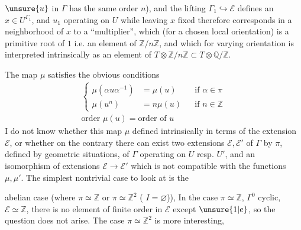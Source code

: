 

\(\unsure{u}\) in \(\Gamma\) has the same order \(n\)),
and the lifting \(\Gamma_1\hookrightarrow\mathcal E\) defines an
\(x\in U^{\Gamma_1}\),  and \(u_1\) operating on \(U\)
while leaving \(x\) fixed therefore corresponds in a neighborhood of \(x\) to a
``multiplier'', which (for a chosen local orientation) is a
primitive  root of \(1\) i.e. an element of
\(\mathbb Z/n\mathbb Z\), and which for varying orientation
is interpreted intrinsically as an element of
\(T\otimes\mathbb Z/n\mathbb Z
\subset T\otimes\mathbb Q/\mathbb Z\).

The map \(\mu\) satisfies the obvious conditions
\[
\begin{gathered}
\left\{
\begin{aligned}
\mu(\alpha u\alpha^{-1})&=\mu(u) &&\text{if }\alpha\in\pi\\
\mu(u^n)&=n\mu(u) &&\text{if }n\in\mathbb Z
\end{aligned}
\right.\\
\text{order }\mu(u)=\text{order of }u
\end{gathered}
\]
I do not know whether this map \(\mu\) 
 defined intrinsically in terms of the extension
\(\mathcal E\), or whether on the contrary there can exist two extensions
 \(\mathcal E,\mathcal E'\) of \(\Gamma\) by \(\pi\),
defined by geometric situations, of \(\Gamma\) operating on
\(U\) resp. \(U'\), and an isomorphism of extensions
\(\mathcal E\longrightarrow\mathcal E'\) which is not compatible with
the functions \(\mu,\mu'\).
The simplest nontrivial case to look at is the



abelian case (where \(\pi\simeq\mathbb Z\)
or \(\pi\simeq\mathbb Z^2\) ( \(I=\varnothing\))),
In the  case
 \(\pi\simeq\mathbb Z\), 
\(\Gamma^0\) cyclic, \(\mathcal E\simeq\mathbb Z\),
there is no element of finite order in \(\mathcal E\) except
\(\unsure{1|e}\), so the question does not arise.
The case \(\pi\simeq\mathbb Z^2\) is more interesting,

